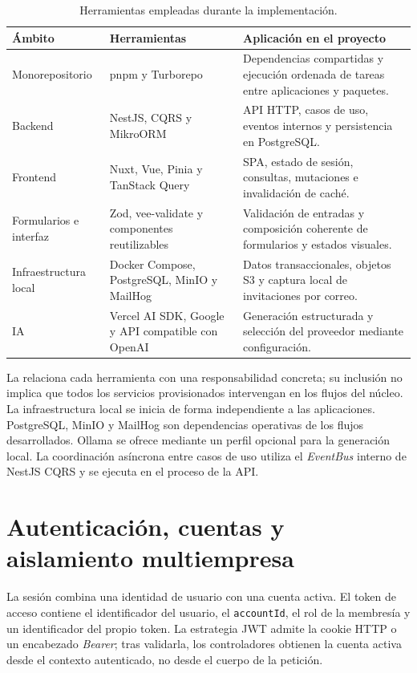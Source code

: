 \begin{table}[htbp]
  \centering
  \caption{Herramientas empleadas durante la implementación.}
  \label{tab:implementation-tools}
  \begin{tabular}{L{0.25\textwidth} L{0.25\textwidth} L{0.41\textwidth}}
    \toprule
    \textbf{Ámbito} & \textbf{Herramientas} & \textbf{Aplicación en el proyecto} \\
    \midrule
    Monorepositorio & pnpm y Turborepo & Dependencias compartidas y ejecución ordenada de tareas entre aplicaciones y paquetes. \\
    Backend & NestJS, CQRS y MikroORM & API HTTP, casos de uso, eventos internos y persistencia en PostgreSQL. \\
    Frontend & Nuxt, Vue, Pinia y TanStack Query & SPA, estado de sesión, consultas, mutaciones e invalidación de caché. \\
    Formularios e interfaz & Zod, vee-validate y componentes reutilizables & Validación de entradas y composición coherente de formularios y estados visuales. \\
    Infraestructura local & Docker Compose, PostgreSQL, MinIO y MailHog & Datos transaccionales, objetos S3 y captura local de invitaciones por correo. \\
    IA & Vercel AI SDK, Google y API compatible con OpenAI & Generación estructurada y selección del proveedor mediante configuración. \\
    \bottomrule
  \end{tabular}
\end{table}

La  relaciona cada herramienta con una
responsabilidad concreta; su inclusión no implica que todos los servicios
provisionados intervengan en los flujos del núcleo. La infraestructura local se
inicia de forma independiente a las aplicaciones.
PostgreSQL, MinIO y MailHog son dependencias operativas de los flujos
desarrollados. Ollama se ofrece mediante un perfil opcional para la generación
local. La coordinación asíncrona entre casos de uso utiliza el
\emph{EventBus} interno de NestJS CQRS y se ejecuta en el proceso de la API.

\section{Autenticación, cuentas y aislamiento multiempresa}

La sesión combina una identidad de usuario con una cuenta activa. El token de
acceso contiene el identificador del usuario, el \texttt{accountId}, el rol de
la membresía y un identificador del propio token. La estrategia JWT admite la
cookie HTTP o un encabezado \emph{Bearer}; tras validarla, los controladores
obtienen la cuenta activa desde el contexto autenticado, no desde el cuerpo de
la petición.

